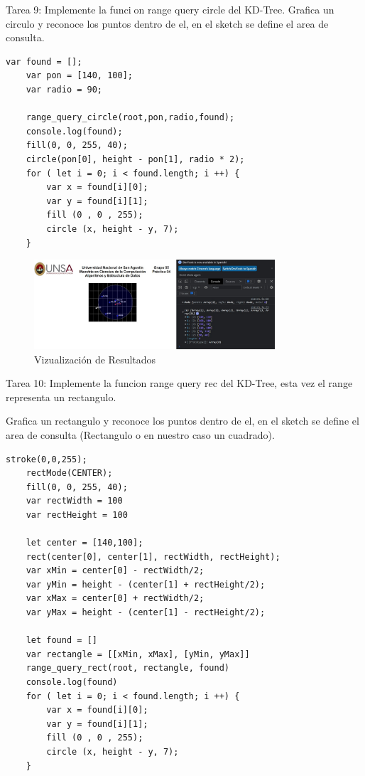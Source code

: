 \documentclass{article}
\begin{document}
Tarea 9: Implemente la funcion range query circle del KD-Tree.
Grafica un circulo y reconoce los puntos  dentro de el, en el sketch se define el area de consulta.

\begin{lstlisting}[style=C]
var found = [];
	var pon = [140, 100];
	var radio = 90;

    range_query_circle(root,pon,radio,found);
    console.log(found);
	fill(0, 0, 255, 40);
	circle(pon[0], height - pon[1], radio * 2);
    for ( let i = 0; i < found.length; i ++) {
        var x = found[i][0];
        var y = found[i][1];
        fill (0 , 0 , 255);
        circle (x, height - y, 7); 
    }
\end{lstlisting}

\begin{figure}[H]
\centering
\includegraphics[width=0.8\textwidth]{img/Resultado9.jpg}
\caption{Vizualización de Resultados}
\end{figure}

Tarea 10: Implemente la funcion range query rec del KD-Tree, esta vez el range representa un rectangulo.

Grafica un rectangulo y reconoce los puntos  dentro de el, en el sketch se define el area de consulta (Rectangulo o  en nuestro caso un cuadrado).

\begin{lstlisting}[style=C]
stroke(0,0,255);
    rectMode(CENTER);
    fill(0, 0, 255, 40);
    var rectWidth = 100
    var rectHeight = 100

    let center = [140,100];
    rect(center[0], center[1], rectWidth, rectHeight);
    var xMin = center[0] - rectWidth/2;
    var yMin = height - (center[1] + rectHeight/2);
    var xMax = center[0] + rectWidth/2;
    var yMax = height - (center[1] - rectHeight/2);

    let found = []
    var rectangle = [[xMin, xMax], [yMin, yMax]]
    range_query_rect(root, rectangle, found)
    console.log(found)
    for ( let i = 0; i < found.length; i ++) {
        var x = found[i][0];
        var y = found[i][1];
        fill (0 , 0 , 255);
        circle (x, height - y, 7); 
    }
\end{lstlisting}
\end{document}
